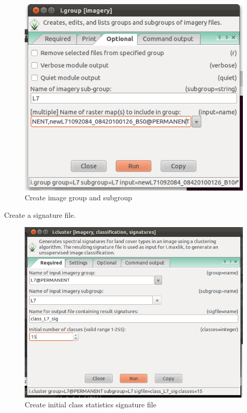 \begin{figure}[htbp]
   \centering
   \includegraphics[scale=0.45]{grass_rs008.png}
   \caption{Create image group and subgroup}
   \label{fig:grass_rs008}
\end{figure}

Create a signature file.

\begin{figure}[htbp]
   \centering
   \includegraphics[scale=0.35]{grass_rs009.png}
   \caption{Create initial class statistics signature file}
   \label{fig:grass_rs009}
\end{figure}

